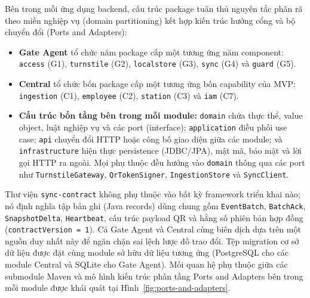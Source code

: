 Bên trong mỗi ứng dụng backend, cấu trúc package tuân thủ nguyên tắc phân rã theo miền nghiệp vụ
(domain partitioning) kết hợp kiến trúc hướng cổng và bộ chuyển đổi (Ports and Adapters):
\begin{itemize}
    \item \textbf{Gate Agent} tổ chức năm package cấp một tương ứng năm component: \texttt{access}
    (G1), \texttt{turnstile} (G2), \texttt{localstore} (G3), \texttt{sync} (G4) và \texttt{guard}
    (G5).
    \item \textbf{Central} tổ chức bốn package cấp một tương ứng bốn capability của MVP:
    \texttt{ingestion} (C1), \texttt{employee} (C2), \texttt{station} (C3) và \texttt{iam} (C7).
    \item \textbf{Cấu trúc bốn tầng bên trong mỗi module:} \texttt{domain} chứa thực thể, value
    object, luật nghiệp vụ và các port (interface); \texttt{application} điều phối use case;
    \texttt{api} chuyển đổi HTTP hoặc công bố giao diện giữa các module; và \texttt{infrastructure}
    hiện thực persistence (JDBC/JPA), mật mã, bảo mật và lời gọi HTTP ra ngoài. Mọi phụ thuộc đều
    hướng vào \texttt{domain} thông qua các port như \texttt{TurnstileGateway},
    \texttt{QrTokenSigner}, \texttt{IngestionStore} và \texttt{SyncClient}.
\end{itemize}

Thư viện \texttt{sync-contract} không phụ thuộc vào bất kỳ framework triển khai nào; nó định nghĩa
tập bản ghi (Java records) dùng chung gồm \texttt{EventBatch}, \texttt{BatchAck},
\texttt{SnapshotDelta}, \texttt{Heartbeat}, cấu trúc payload QR và hằng số phiên bản hợp đồng
(\texttt{contractVersion = 1}). Cả Gate Agent và Central cùng biên dịch dựa trên một nguồn duy nhất
này để ngăn chặn sai lệch lược đồ trao đổi. Tệp migration cơ sở dữ liệu được đặt cùng module sở hữu
dữ liệu tương ứng (PostgreSQL cho các module Central và SQLite cho Gate Agent). Mối quan hệ phụ thuộc giữa
các submodule Maven và mô hình kiến trúc phân tầng Ports and Adapters bên trong mỗi module được khái quát
tại Hình~\ref{fig:ports-and-adapters}.

